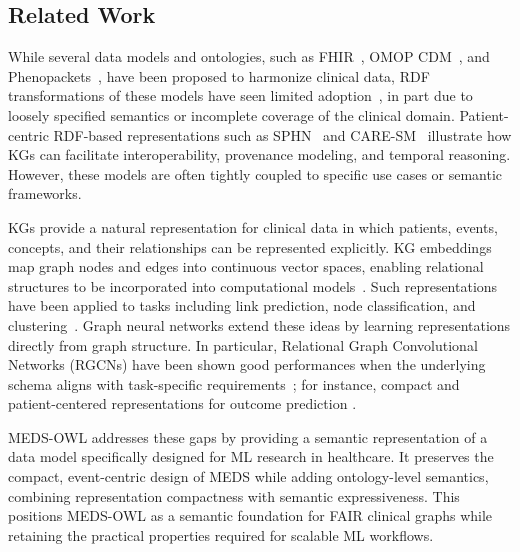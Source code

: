 %
%
%
%
%

\subsection{Related Work}
\label{sec:paper3_related_work}
%
While several data models and ontologies, such as FHIR~\cite{lehne_use_2019}, OMOP CDM~\cite{xiao_fhir-ontop-omop_2022}, and Phenopackets~\cite{kaliyaperumal_phenopackets_2022}, have been proposed to harmonize clinical data, RDF transformations of these models have seen limited adoption~\cite{xiao_fhir-ontop-omop_2022,marfoglia_towards_2025}, in part due to loosely specified semantics or incomplete coverage of the clinical domain.
Patient-centric RDF-based representations such as SPHN~\cite{toure2023} and CARE-SM~\cite{kaliyaperumal_semantic_2022} illustrate how KGs can facilitate interoperability, provenance modeling, and temporal reasoning.
However, these models are often tightly coupled to specific use cases or semantic frameworks.

KGs provide a natural representation for clinical data in which patients, events, concepts, and their relationships can be represented explicitly. KG embeddings map graph nodes and edges into continuous vector spaces, enabling relational structures to be incorporated into computational models~\cite{hamilton_representation_2018}. Such representations have been applied to tasks including link prediction, node classification, and clustering~\cite{wang_knowledge_2017}. Graph neural networks extend these ideas by learning representations directly from graph structure. In particular, Relational Graph Convolutional Networks (RGCNs) have been shown good performances when the underlying schema aligns with task-specific requirements~\cite{schlichtkrull_2018}; for instance, compact and patient-centered representations for outcome prediction \cite{MARFOGLIA2026108380}. 

MEDS-OWL addresses these gaps by providing a semantic representation of a data model specifically designed for ML research in healthcare. It preserves the compact, event-centric design of MEDS while adding ontology-level semantics, combining representation compactness with semantic expressiveness. This positions MEDS-OWL as a semantic foundation for FAIR clinical graphs while retaining the practical properties required for scalable ML workflows.

